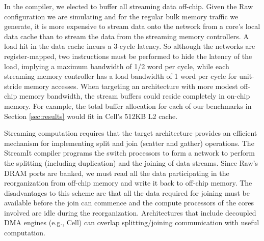 

In the compiler, we elected to buffer all streaming data off-chip.
Given the Raw configuration we are simulating and for the regular bulk
memory traffic we generate, it is more expensive to stream data onto
the network from a core's local data cache than to stream the data
from the streaming memory controllers. A load hit in the data cache
incurs a 3-cycle latency.  So although the networks are
register-mapped, two instructions must be performed to hide the
latency of the load, implying a maximum bandwidth of 1/2 word per
cycle, while each streaming memory controller has a load bandwidth of
1 word per cycle for unit-stride memory accesses.  When targeting an
architecture with more modest off-chip memory bandwidth, the stream
buffers could reside completely in on-chip memory.  For example, the
total buffer allocation for each of our benchmarks in Section
\ref{sec:results} would fit in Cell's 512KB L2 cache.

Streaming computation requires that the target architecture provides
an efficient mechanism for implementing split and join (scatter and
gather) operations.  The StreamIt compiler programs the switch
processors to form a network to perform the splitting (including
duplication) and the joining of data streams.  Since Raw's DRAM ports
are banked, we must read all the data participating in the
reorganization from off-chip memory and write it back to off-chip
memory.  The disadvantages to this scheme are that all the data
required for joining must be available before the join can commence
and the compute processors of the cores involved are idle during the
reorganization.  Architectures that include decoupled DMA engines
(e.g., Cell) can overlap splitting/joining communication with useful
computation.

